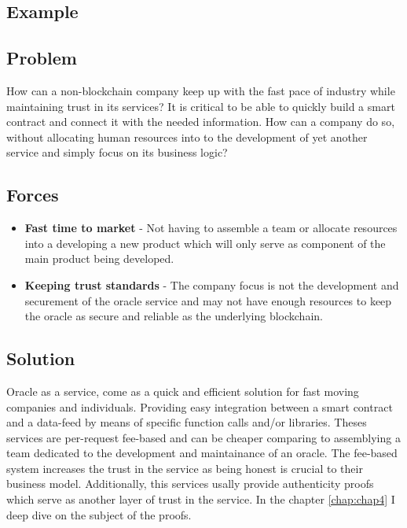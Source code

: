 \subsection{Example}



\subsection{Problem}
How can a non-blockchain company keep up with the fast pace of industry while maintaining trust in its services? It is critical to be able to quickly build a smart contract and connect it with the needed information. How can a company do so, without allocating human resources into to the development of yet another service and simply focus on its business logic?

\subsection{Forces}

\begin{itemize}
  \item \textbf{Fast time to market} - Not having to assemble a team or allocate resources into a developing a new product which will only serve as component of the main product being developed.
  \item \textbf{Keeping trust standards} - The company focus is not the development and securement of the oracle service and may not have enough resources to keep the oracle as secure and reliable as the underlying blockchain.
\end{itemize}


\subsection{Solution}
Oracle as a service, come as a quick and efficient solution for fast moving companies and individuals. Providing easy integration between a smart contract and a data-feed by means of specific function calls and/or libraries. Theses services are per-request fee-based and can be cheaper comparing to assemblying a team dedicated to the development and maintainance of an oracle. The fee-based system increases the trust in the service as being honest is crucial to their business model. Additionally, this services usally provide authenticity proofs which serve as another layer of trust in the service. In the chapter \ref{chap:chap4} I deep dive on the subject of the proofs.

